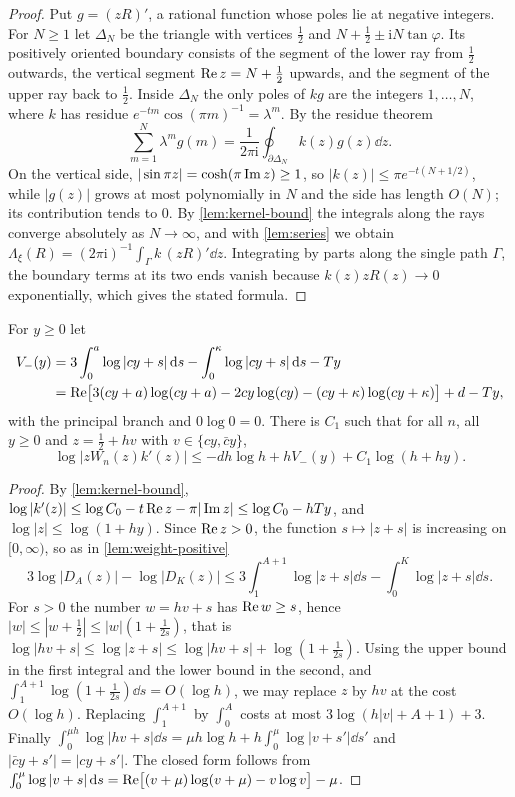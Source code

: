 \begin{proof}
Put $g=(zR)'$, a rational function whose poles lie at negative integers. For $N\ge1$ let $\Delta_N$ be the triangle with vertices $\frac12$ and $N+\frac12\pm\mathrm iN\tan\varphi$. Its positively oriented boundary consists of the segment of the lower ray from $\frac12$ outwards, the vertical segment $\operatorname{Re} z=N+\frac12$ upwards, and the segment of the upper ray back to $\frac12$. Inside $\Delta_N$ the only poles of $kg$ are the integers $1,\dots,N$, where $k$ has residue $e^{-tm}\cos(\pi m)^{-1}=\lambda^m$. By the residue theorem
\[
\sum_{m=1}^N\lambda^mg(m)=\frac1{2\pi\mathrm i}\oint_{\partial\Delta_N}k(z)g(z)\dd z .
\]
On the vertical side, $|\sin\pi z|=\cosh(\pi\operatorname{Im} z)\ge1$, so $|k(z)|\le\pi e^{-t(N+1/2)}$, while $|g(z)|$ grows at most polynomially in $N$ and the side has length $O(N)$; its contribution tends to $0$. By \cref{lem:kernel-bound} the integrals along the rays converge absolutely as $N\to\infty$, and with \cref{lem:series} we obtain $\Lambda_\xi(R)=(2\pi\mathrm i)^{-1}\int_\Gamma k\,(zR)'\dd z$. Integrating by parts along the single path $\Gamma$, the boundary terms at its two ends vanish because $k(z)zR(z)\to0$ exponentially, which gives the stated formula.
\end{proof}

\begin{lemma}\label{lem:weight-negative}
For $y\ge0$ let
\begin{align*}
V_-(y)&=3\int_0^a\log|cy+s|\,\mathrm{d} s-\int_0^\kappa\log|cy+s|\,\mathrm{d} s-Ty\\
&=\operatorname{Re}\bigl[3(cy+a)\log(cy+a)-2cy\log(cy)-(cy+\kappa)\log(cy+\kappa)\bigr]+d-Ty,
\end{align*}
with the principal branch and $0\log0=0$. There is $C_1$ such that for all $n$, all $y\ge0$ and $z=\frac12+hv$ with $v\in\{cy,\bar cy\}$,
\[
\log\bigl|zW_n(z)k'(z)\bigr|\le-dh\log h+hV_-(y)+C_1\log(h+hy).
\]
\end{lemma}

\begin{proof}
By \cref{lem:kernel-bound}, $\log|k'(z)|\le\log C_0-t\operatorname{Re} z-\pi|\operatorname{Im} z|\le\log C_0-hTy$, and $\log|z|\le\log(1+hy)$. Since $\operatorname{Re} z>0$, the function $s\mapsto|z+s|$ is increasing on $[0,\infty)$, so as in \cref{lem:weight-positive}
\[
3\log|D_A(z)|-\log|D_K(z)|\le3\int_1^{A+1}\log|z+s|\dd s-\int_0^K\log|z+s|\dd s .
\]
For $s>0$ the number $w=hv+s$ has $\operatorname{Re} w\ge s$, hence $|w|\le|w+\frac12|\le|w|(1+\frac1{2s})$, that is $\log|hv+s|\le\log|z+s|\le\log|hv+s|+\log(1+\frac1{2s})$. Using the upper bound in the first integral and the lower bound in the second, and $\int_1^{A+1}\log(1+\frac1{2s})\dd s=O(\log h)$, we may replace $z$ by $hv$ at the cost $O(\log h)$. Replacing $\int_1^{A+1}$ by $\int_0^A$ costs at most $3\log(h|v|+A+1)+3$. Finally $\int_0^{\mu h}\log|hv+s|\dd s=\mu h\log h+h\int_0^\mu\log|v+s'|\dd s'$ and $|\bar cy+s'|=|cy+s'|$. The closed form follows from $\int_0^\mu\log|v+s|\,\mathrm{d} s=\operatorname{Re}\bigl[(v+\mu)\log(v+\mu)-v\log v\bigr]-\mu$.
\end{proof}

